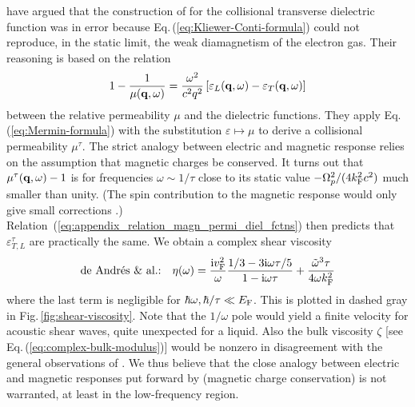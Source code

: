 \documentclass[11pt, oneside]{article}   	%
\def\OmegaP{\Omega_{p}}
\begin{document}
\citet{deAndres_1986} have argued that the construction of \citet{Kliewer_1969a} for
the collisional transverse dielectric function was in error because 
Eq.\,(\ref{eq:Kliewer-Conti-formula}) could not reproduce, in the static limit, the
weak diamagnetism of the electron gas. 
Their reasoning is based on the relation
\begin{equation}
1 - \frac{1}{{\mu}({\bf q}, \omega)} = \frac{\omega^2}{c^2q^2} \left[ \varepsilon_{L}({\bf q}, \omega) - \varepsilon_{T}({\bf q}, \omega)\right]
\label{eq:appendix_relation_magn_permi_diel_fctns}
\end{equation}
between the relative permeability $\mu$ and the dielectric functions. They apply
Eq.\,(\ref{eq:Mermin-formula}) 
with the substitution $\varepsilon \mapsto {\mu}$ to derive a collisional permeability 
$\mu^{\tau}$. The strict analogy between electric and magnetic response relies on the 
assumption that magnetic charges be conserved. It turns out that 
$\mu^{\tau}( {\bf q}, \omega ) - 1$ is for frequencies $\omega \sim 1/ \tau$ 
close to its static value 
$ - \OmegaP^2 / (4 k^2_{\rm F} c^2 )$ much smaller than unity. (The spin
contribution to the magnetic response would only give small corrections 
\citep{Lindhard_1954, deAndres_1986}.)
Relation~(\ref{eq:appendix_relation_magn_permi_diel_fctns}) then predicts
that $\varepsilon_{T,L}^{\tau}$ are practically the same.
We obtain a complex shear viscosity
\begin{equation}
\text{de Andr\'es \& al.:}\quad
\eta(\omega)  = \frac{{\rm i} v^2_{\rm F}}{\omega}\frac{1/3 - 3 {\rm i} \omega\tau/ 5}{1 - {\rm i} \omega\tau} 
+ \frac{\tilde{\omega}^3\tau}{4\omega k^2_{\rm F}}
\label{eq:result-eta-deAndres}
\end{equation}
where the last term is negligible for $\hbar\omega, \hbar/\tau \ll E_{\rm F}$. This is plotted
in dashed gray in Fig.\,\ref{fig:shear-viscosity}.
Note that
the $1/\omega$ pole would yield a finite velocity for acoustic shear waves, quite unexpected
for a liquid. Also the bulk viscosity $\zeta$ [see Eq.\,(\ref{eq:complex-bulk-modulus})] 
would be nonzero in disagreement with the
general observations of \citet{Conti_1999}. We thus believe that the close analogy between
electric and magnetic responses put forward by \citet{deAndres_1986} (magnetic charge
conservation) is not warranted, at least in the low-frequency region.



%
%
\end{document}
